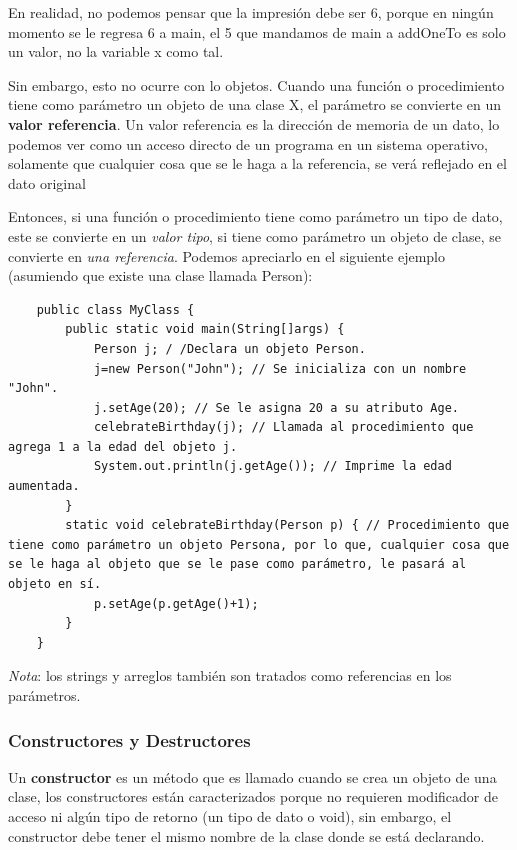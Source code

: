 En realidad, no podemos pensar que la impresión debe ser 6, porque en ningún momento se le regresa 6 a main, el 5 que mandamos de main a addOneTo es solo un valor, no la variable x como tal.

Sin embargo, esto no ocurre con lo objetos. Cuando una función o procedimiento tiene como parámetro un objeto de una clase X, el parámetro se convierte en un \textbf{valor referencia}. Un valor referencia es la dirección de memoria de un dato, lo podemos ver como un acceso directo de un programa en un sistema operativo, solamente que cualquier cosa que se le haga a la referencia, se verá reflejado en el dato original

Entonces, si una función o procedimiento tiene como parámetro un tipo de dato, este se convierte en un \textit{valor tipo}, si tiene como parámetro un objeto de clase, se convierte en \textit{una referencia}. Podemos apreciarlo en el siguiente ejemplo (asumiendo que existe una clase llamada Person):
\begin{lstlisting}
    public class MyClass {
        public static void main(String[]args) {
            Person j; / /Declara un objeto Person.
            j=new Person("John"); // Se inicializa con un nombre "John".
            j.setAge(20); // Se le asigna 20 a su atributo Age.
            celebrateBirthday(j); // Llamada al procedimiento que agrega 1 a la edad del objeto j.
            System.out.println(j.getAge()); // Imprime la edad aumentada.
        }
        static void celebrateBirthday(Person p) { // Procedimiento que tiene como parámetro un objeto Persona, por lo que, cualquier cosa que se le haga al objeto que se le pase como parámetro, le pasará al objeto en sí.
            p.setAge(p.getAge()+1);
        }
    }
\end{lstlisting}

\textit{Nota}: los strings y arreglos también son tratados como referencias en los parámetros.


\subsubsection{Constructores y Destructores}
\hspace{0.55cm}Un \textbf{constructor} es un método que es llamado cuando se crea un objeto de una clase, los constructores están caracterizados porque no requieren modificador de acceso ni algún tipo de retorno (un tipo de dato o void), sin embargo, el constructor debe tener el mismo nombre de la clase donde se está declarando.

